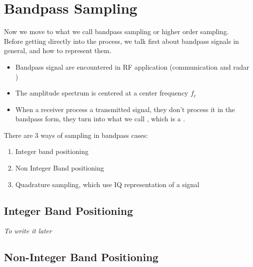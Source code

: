 \documentclass[12pt,a4paper]{book}
\begin{document}



\chapter{Bandpass Sampling}

Now we move to what we call bandpass sampling or higher order sampling. Before getting directly into the process, we talk first about bandpass signals in general, and how to represent them.

\begin{itemize}

\item Bandpass signal are encountered in RF application (communication and radar )


\item The amplitude spectrum is centered at a center frequency $f_c$

\item When a receiver process a transmitted signal, they don't process it in the bandpass form, they turn into what we call , which is a .

\end{itemize}

There are 3 ways of sampling in bandpass cases:

\begin{enumerate}
    \item Integer band positioning
    
    \item Non Integer Band positioning
    
    \item Quadrature sampling, which use IQ representation of a signal
    
\end{enumerate}


\section{Integer Band Positioning}


\textit{To write it later}


\section{Non-Integer Band Positioning}
\end{document}

